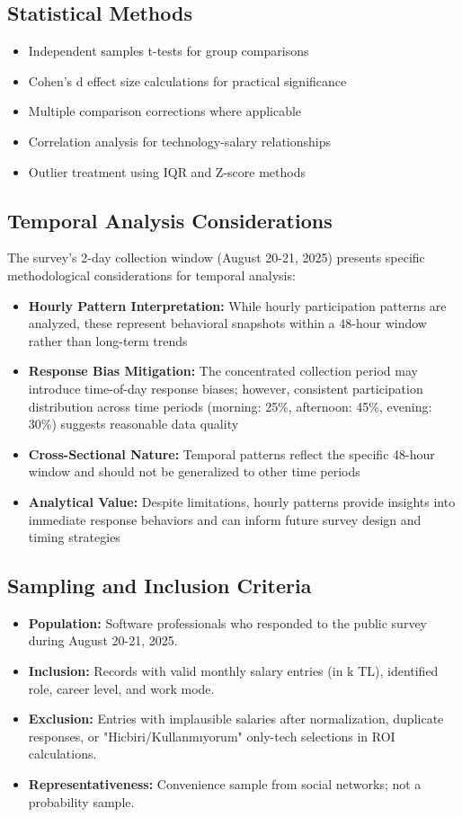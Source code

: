 \documentclass[12pt,a4paper]{article}
\begin{document}
\subsection{Statistical Methods}
\begin{itemize}
    \item Independent samples t-tests for group comparisons
    \item Cohen's d effect size calculations for practical significance
    \item Multiple comparison corrections where applicable
    \item Correlation analysis for technology-salary relationships
    \item Outlier treatment using IQR and Z-score methods
\end{itemize}

\subsection{Temporal Analysis Considerations}
The survey's 2-day collection window (August 20-21, 2025) presents specific methodological considerations for temporal analysis:

\begin{itemize}
    \item \textbf{Hourly Pattern Interpretation:} While hourly participation patterns are analyzed, these represent behavioral snapshots within a 48-hour window rather than long-term trends
    \item \textbf{Response Bias Mitigation:} The concentrated collection period may introduce time-of-day response biases; however, consistent participation distribution across time periods (morning: 25\%, afternoon: 45\%, evening: 30\%) suggests reasonable data quality
    \item \textbf{Cross-Sectional Nature:} Temporal patterns reflect the specific 48-hour window and should not be generalized to other time periods
    \item \textbf{Analytical Value:} Despite limitations, hourly patterns provide insights into immediate response behaviors and can inform future survey design and timing strategies
\end{itemize}

\subsection{Sampling and Inclusion Criteria}
\begin{itemize}
    \item \textbf{Population:} Software professionals who responded to the public survey during August 20-21, 2025.
    \item \textbf{Inclusion:} Records with valid monthly salary entries (in k TL), identified role, career level, and work mode.
    \item \textbf{Exclusion:} Entries with implausible salaries after normalization, duplicate responses, or "Hicbiri/Kullanmıyorum" only-tech selections in ROI calculations.
    \item \textbf{Representativeness:} Convenience sample from social networks; not a probability sample.
\end{itemize}
\end{document}
